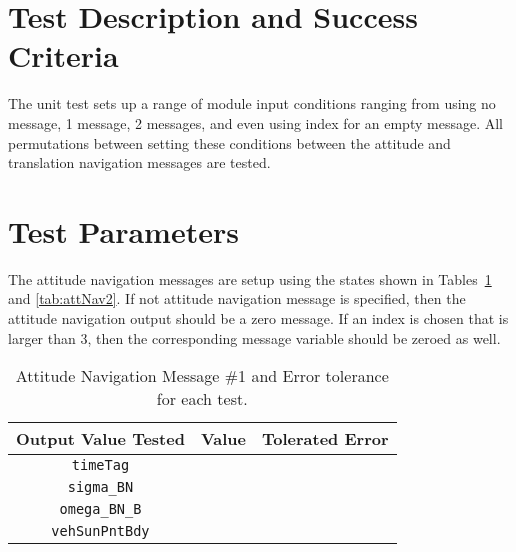
\section{Test Description and Success Criteria}
The unit test sets up a range of module input conditions ranging from using no message, 1 message, 2 messages, and even using index for an empty message.  All permutations between setting these conditions between the attitude and translation navigation messages are tested. 




\section{Test Parameters}

The attitude navigation messages are setup using the states shown in Tables~\ref{tab:attNav1} and \ref{tab:attNav2}.  If not attitude navigation message is specified, then the attitude navigation output should be a zero message.  If an index is chosen that is larger than 3, then the corresponding message variable should be zeroed as well.

\begin{table}[htbp]
	\caption{Attitude Navigation Message \#1 and Error tolerance for each test.}
	\label{tab:attNav1}
	\centering \fontsize{10}{10}\selectfont
	\begin{tabular}{ c | c | c } %
		\hline\hline
		\textbf{Output Value Tested} & \textbf{Value} & \textbf{Tolerated Error}  \\ 
		\hline
		{\tt timeTag}  &       & 	   \\ 
		{\tt sigma\_BN}  &       & 	   \\ 
		{\tt omega\_BN\_B}  &       & 	   \\ 
		{\tt vehSunPntBdy}  &       & 	   \\ 
		\hline\hline
	\end{tabular}
\end{table}

